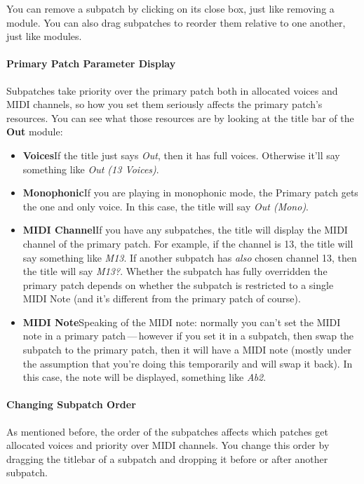 \documentclass{article}
\begin{document}
You can remove a subpatch by clicking on its close box, just like removing a module.  You can also drag subpatches to reorder them relative to one another, just like modules.

\paragraph{Primary Patch Parameter Display}  Subpatches take priority over the primary patch both in allocated voices and MIDI channels, so how you set them seriously affects the primary patch's resources.  You can see what those resources are by looking at the title bar of the {\bf Out} module:

\begin{itemize}
\item {\bf Voices}\quad  If the title just says {\it Out}, then it has full voices. Otherwise it'll say something like {\it Out (13 Voices)}.
\item {\bf Monophonic}\quad  If you are playing in monophonic mode, the Primary patch gets the one and only voice.  In this case, the title will say {\it Out (Mono)}.
\item {\bf MIDI Channel}\quad  If you have any subpatches, the title will display the MIDI channel of the primary patch.  For example, if the channel is 13, the title will say something like {\it M13}.  If another subpatch has {\it also} chosen channel 13, then the title will say {\it M13?}.  Whether the subpatch has fully overridden the primary patch depends on whether the subpatch is restricted to a single MIDI Note (and it's different from the primary patch of course).
\item {\bf MIDI Note}\quad  Speaking of the MIDI note: normally you can't set the MIDI note in a primary patch\,---\,however if you set it in a subpatch, then swap the subpatch to the primary patch, then it will have a MIDI note (mostly under the assumption that you're doing this temporarily and will swap it back).  In this case, the note will be displayed, something like {\it Ab2}.
\end{itemize}

\paragraph{Changing Subpatch Order}

As mentioned before, the order of the subpatches affects which patches get allocated voices and priority over MIDI channels.  You change this order by dragging the titlebar of a subpatch and dropping it before or after another subpatch.
\end{document}
